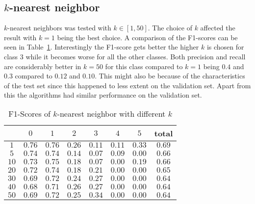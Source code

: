 \subsection{$k$-nearest neighbor}
$k$-nearest neighbors was tested with $k \in [1,50]$. The choice of $k$ affected the result with $k=1$ being the best choice. A comparison of the F1-scores can be seen in Table~\ref{ds2:table:knnf1}. Interestingly the F1-score gets better the higher $k$ is chosen for class $3$ while it becomes worse for all the other classes. Both precision and recall are considerably better in $k=50$ for this class compared to $k=1$
being $0.4$ and $0.3$ compared to $0.12$ and $0.10$. This might also be because of the characteristics of the test set since this happened to less extent on the validation set. Apart from this the algorithms had similar performance on the validation set.
\begin{table}[p]
	\begin{center}
		\begin{tabular}{|c|c|c|c|c|c|c|c|}
			\hline \backslashbox{k}{Class} & $0$ & $1$ & $2$ & $3$ &$4$  &$ 5$ & total \\
\hline $1$ & $0.76$ & $0.76$ & $0.26$ & $0.11$ & $0.11$ & $0.33$ & $0.69$ \\
\hline $5$ & $0.74$ & $0.74$ & $0.14$ & $0.07$ & $0.09$ & $0.00$ & $0.66$ \\
\hline $10$ & $0.73$ & $0.75$ &$0.18$ & $0.07$ & $0.00$ & $0.19$ & $0.66$ \\
\hline $20$ & $0.72$ & $0.74$ &$0.18$ & $0.21$ & $0.00$ &	$0.00$ & $0.65$ \\
\hline $30$ & $0.69$ & $0.72$ &$0.24$ & $0.27$ & $0.00$ & $0.00$ & $0.64$ \\
\hline $40$ & $0.68$ & $0.71$ &$0.26$ &	$0.27$ & $0.00$ & $0.00$ & $0.64$ \\
\hline $50$ & $0.69$ & $0.72$ &$0.25$ & $0.34$ & $0.00$ & $0.00$ & $0.64$ \\
\hline
	\end{tabular}
	\end{center}
	\caption{F1-Scores of $k$-nearest neighbor with different $k$\label{ds2:table:knnf1}}
\end{table}

